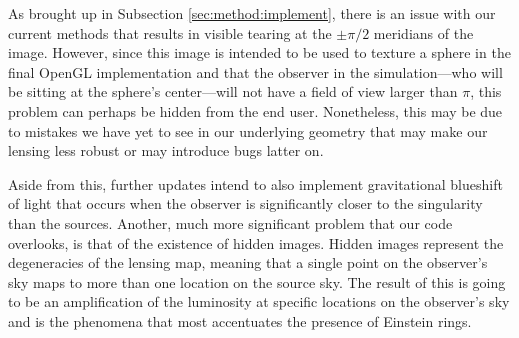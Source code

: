 \documentclass{standalone}
\begin{document}
As brought up in Subsection \ref{sec:method:implement}, there is an issue with our current methods that results in visible tearing at the $\pm\pi/2$ meridians of the image.
However, since this image is intended to be used to texture a sphere in the final OpenGL implementation and that the observer in the simulation---who will be sitting at the sphere's center---will not have a field of view larger than $\pi$, this problem can perhaps be hidden from the end user.
Nonetheless, this may be due to mistakes we have yet to see in our underlying geometry that may make our lensing less robust or may introduce bugs latter on.

Aside from this, further updates intend to also implement gravitational blueshift of light that occurs when the observer is significantly closer to the singularity than the sources.
Another, much more significant problem that our code overlooks, is that of the existence of hidden images.
Hidden images represent the degeneracies of the lensing map, meaning that a single point on the observer's sky maps to more than one location on the source sky.
The result of this is going to be an amplification of the luminosity at specific locations on the observer's sky and is the phenomena that most accentuates the presence of Einstein rings.
\end{document}
